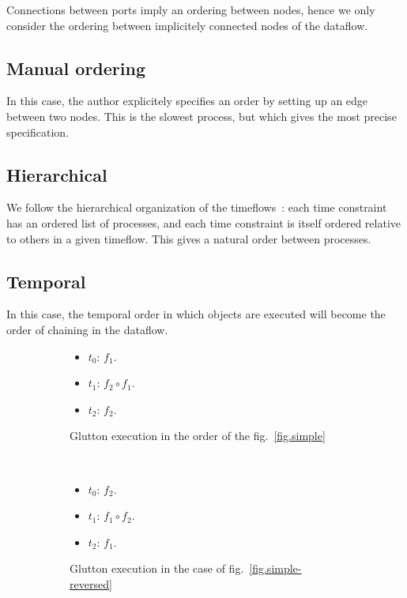 \documentclass{article}
\begin{document}
Connections between ports imply an ordering between nodes, hence we only consider the ordering between implicitely connected nodes of the dataflow.
    
\subsection{Manual ordering}
In this case, the author explicitely specifies an order by setting up an edge between two nodes. 
This is the slowest process, but which gives the most precise specification.
    
\subsection{Hierarchical}
We follow the hierarchical organization of the timeflows~: each time constraint has an ordered list of processes, and each time constraint is itself ordered relative to others in a given timeflow. 
This gives a natural order between processes.
    
\subsection{Temporal}
In this case, the temporal order in which objects are executed
will become the order of chaining in the dataflow.
    
    
\begin{figure}
  \begin{subfigure}{0.20\textwidth }    		    		
    \begin{itemize}
      \item $t_0$: $f_1$.
      \item $t_1$: $f_2 \circ f_1$.
      \item $t_2$: $f_2$. 
    \end{itemize}
    \caption{Glutton execution in the order of the fig.~\ref{fig.simple}}
  \end{subfigure}~
  \begin{subfigure}{0.20\textwidth}
    		    	
    \begin{itemize}
      \item $t_0$: $f_2$.
      \item $t_1$: $f_1 \circ f_2$.
      \item $t_2$: $f_1$. 
    \end{itemize}
    \caption{
    	Glutton execution in the case of fig.~\ref{fig.simple-reversed}}
  \end{subfigure}
  \caption{}
\end{figure}
    
\end{document}
